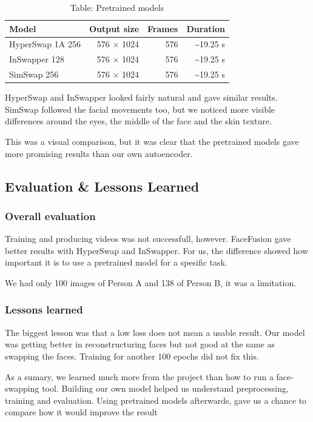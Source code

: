 \begin{table}[tb]
  \centering
  \footnotesize
  \begin{tabular}{@{}l r r r@{}}
    \toprule
    Model & Output size & Frames & Duration \\
    \midrule
    HyperSwap 1A 256 & 576 $\times$ 1024 & 576 & \textasciitilde{}19.25 s \\
    InSwapper 128 & 576 $\times$ 1024 & 576 & \textasciitilde{}19.25 s \\
    SimSwap 256 & 576 $\times$ 1024 & 576 & \textasciitilde{}19.25 s \\
    \bottomrule
  \end{tabular}
  \caption*{Table: Pretrained models}
\end{table}

HyperSwap and InSwapper looked fairly natural and gave similar results. SimSwap followed the facial movements too, but we noticed more visible differences around the eyes, the middle of the face and the skin texture.

This was a visual comparison, but it was clear that the pretrained models gave more promising results than our own autoencoder.

\subsection{Evaluation \& Lessons Learned}
\subsubsection{Overall evaluation}
Training and producing videos was not successfull, however. FaceFusion gave better results with HyperSwap and InSwapper. For us, the difference showed how important it is to use a pretrained model for a spesific task.

We had only 100 images of Person A and 138 of Person B, it was a limitation.

\subsubsection{Lessons learned}
The biggest lesson was that a low loss does not mean a usable result. Our model was getting better in reconstructuring faces but not good at the same as swapping the faces. Training for another 100 epochs did not fix this.

As a sumary, we learned much more from the project than how to run a face-swapping tool. Building our own model helped us understand preprocessing, training and evaluation. Using pretrained models afterwards, gave us a chance to compare how it would improve the result

